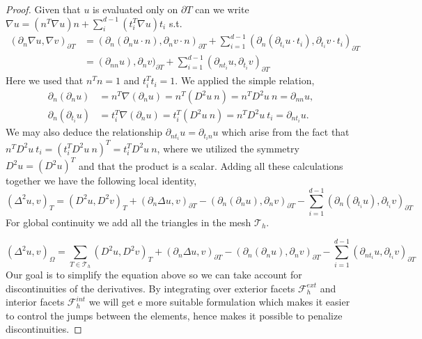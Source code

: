\begin{proof}
Given that $u$ is evaluated only on $\partial T$ can we write
$\nabla u = \left( n^{T} \nabla u   \right) n + \sum_i^{d-1} \left( t_i^{T} \nabla u   \right) t_i$ s.t.
\[
    \begin{split}
(  \partial_n\nabla u, \nabla v ) _{\partial_{} T  } & =  ( \partial _{n} ( \partial_{n}u \cdot n), \partial _{n} v \cdot n )_{\partial T}   +\sum_{i=1}^{d-1} ( \partial _{n} ( \partial_{t_{i}}u \cdot t_{i}), \partial _{t_{i}} v \cdot t_{i} )_{\partial T} \\
& =  ( \partial _{nn} u ), \partial _{n} v  )_{\partial T}+\sum_{i=1}^{d-1} ( \partial _{n t_{i}}u , \partial _{t_{i}} v  )_{\partial T}
    \end{split}
\]
Here we used that $n^{T} n = 1$ and $t_{i}^{T} t_{i} = 1$.
We applied the simple relation,
    \begin{align*}
\partial_n (\partial_n u)  & = n^T \nabla (\partial_n u)  = n ^T (D^2 u \ n)  = n^{T} D^2 u \ n = \partial _{nn} u, \\
\partial_n (\partial_{t_{i}} u)  & = t_{i}^T \nabla (\partial_n u)  = t_i^T (D^2 u \ n )   = n^{T} D^2 u \ t_{i} = \partial _{n t_{i}} u.
    \end{align*}
We may also deduce the relationship $\partial _{nt_{i}} u = \partial _{t_{i}n}u$ which arise from the fact that $n^{T} D^2u \ t_{i} = ( t_{i}^{T} D^2u \  n)^T = t_{i}^{T}  D^2u \  n$, where we utilized the symmetry $D^2u = ( D^2u) ^{T} $ and that the
product is a scalar.
Adding all these calculations together we have the following local identity,
\[
( \Delta ^2 u, v) _{T}   = ( D^2 u, D^2v)_{T } + ( \partial _{n}  \Delta u, v )_{\partial T} -( \partial _{n} ( \partial_{n}u ), \partial _{n} v  )_{\partial T}-\sum_{i=1}^{d-1} ( \partial _{n} ( \partial_{t_{i}}u ), \partial _{t_{i}} v  )_{\partial T}
\]
For global continuity we add all the triangles in the mesh $\mathcal{T} _{h}$.

\begin{equation}
\label{eq:bi_basic_dg2}
\left( \Delta  ^{2} u,v \right) _{\Omega } = \sum_{T \in  \mathcal{T} _{h}}^{}  ( D^2 u, D^2v)_{T } + ( \partial _{n}  \Delta u, v )_{\partial T} -( \partial _{n} ( \partial_{n}u ), \partial _{n} v  )_{\partial T}-\sum_{i=1}^{d-1} ( \partial _{n t_{i}} u , \partial _{t_{i}} v  )_{\partial T}
\end{equation}
Our goal is to simplify the equation above so we can take account for discontinuities of the derivatives.
By integrating over exterior facets $\mathcal{F} _{h}^{ext}$ and interior facets $\mathcal{F} _{h}^{int}$ we will get e more suitable formulation which makes it easier to control the jumps between the elements, hence makes it possible to penalize discontinuities.


\end{proof}
